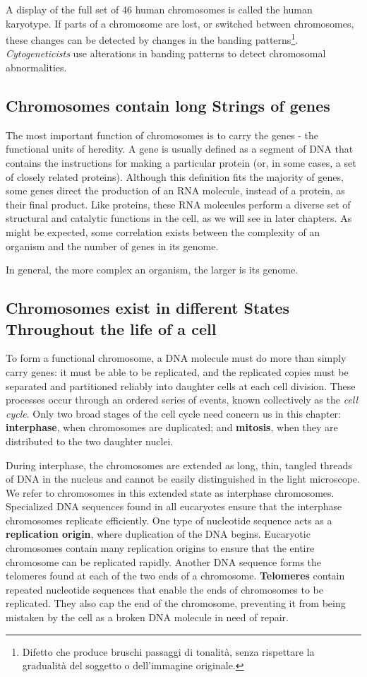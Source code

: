 A display of the full set of 46 human chromosomes is called the human
karyotype. If parts of a chromosome are lost, or switched between chromosomes,
these changes can be detected by changes in the banding
patterns\footnote{Difetto che produce bruschi passaggi di tonalità, senza rispettare 
la gradualità del soggetto o dell'immagine originale.}. \textit{Cytogeneticists} use alterations in banding patterns to detect
chromosomal abnormalities.

\subsection{Chromosomes contain long Strings of genes}

The most important function of chromosomes is to carry the genes - the
functional units of heredity. A gene is usually defined as a
segment of DNA that contains the instructions for making a particular
protein (or, in some cases, a set of closely related proteins). Although
this definition fits the majority of genes, some genes direct the production
of an RNA molecule, instead of a protein, as their final product. Like
proteins, these RNA molecules perform a diverse set of structural and
catalytic functions in the cell, as we will see in later chapters.
As might be expected, some correlation exists between the complexity
of an organism and the number of genes in its genome.

In general, the more complex an organism, the larger is its genome.

\subsection{Chromosomes exist in different States Throughout the life of a cell}

To form a functional chromosome, a DNA molecule must do more than
simply carry genes: it must be able to be replicated, and the replicated
copies must be separated and partitioned reliably into daughter cells at
each cell division. These processes occur through an ordered series of
events, known collectively as the \textit{cell cycle}.
Only two broad stages of the cell cycle need concern
us in this chapter: \textbf{interphase}, when chromosomes are duplicated; and
\textbf{mitosis}, when they are distributed to the two daughter nuclei.

During interphase, the chromosomes are extended as long, thin, tangled
threads of DNA in the nucleus and cannot be easily distinguished
in the light microscope. We refer to chromosomes in this extended state
as interphase chromosomes. Specialized DNA sequences found in all
eucaryotes ensure that the interphase chromosomes replicate efficiently.
One type of nucleotide sequence acts as a \textbf{replication origin}, where duplication of the DNA begins.
Eucaryotic chromosomes contain many replication origins to ensure that
the entire chromosome can be replicated rapidly. Another DNA sequence
forms the telomeres found at each of the two ends of a chromosome.
\textbf{Telomeres} contain repeated nucleotide sequences that enable the ends
of chromosomes to be replicated. They also
cap the end of the chromosome, preventing it from being mistaken by the
cell as a broken DNA molecule in need of repair.

